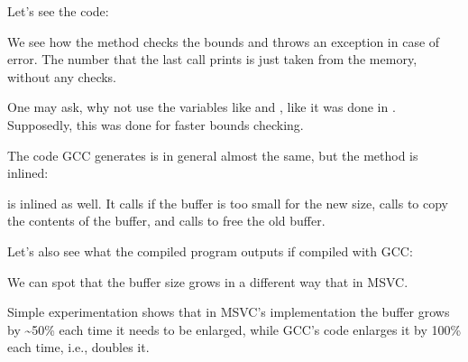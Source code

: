 Let's see the code:



We see how the  
method checks the bounds and throws an exception in case of error.
The number that the last \printf call prints is just taken from the memory, without any checks.

One may ask, why not use the variables like  and , 
like it was done in .
Supposedly, this was done for faster bounds checking.


The code GCC generates is in general almost the same, but the  method is inlined:



 is inlined as well.
It calls  if the buffer is too small for the new size, calls  
to copy the contents of the buffer, and calls  to free the old buffer.

Let's also see what the compiled program outputs if compiled with GCC:



We can spot that the buffer size grows in a different way that in MSVC.

Simple experimentation shows that in MSVC's implementation the buffer grows by \textasciitilde{}50\% each time it needs to be enlarged,
while GCC's code enlarges it by 100\% each time, i.e., doubles it.

